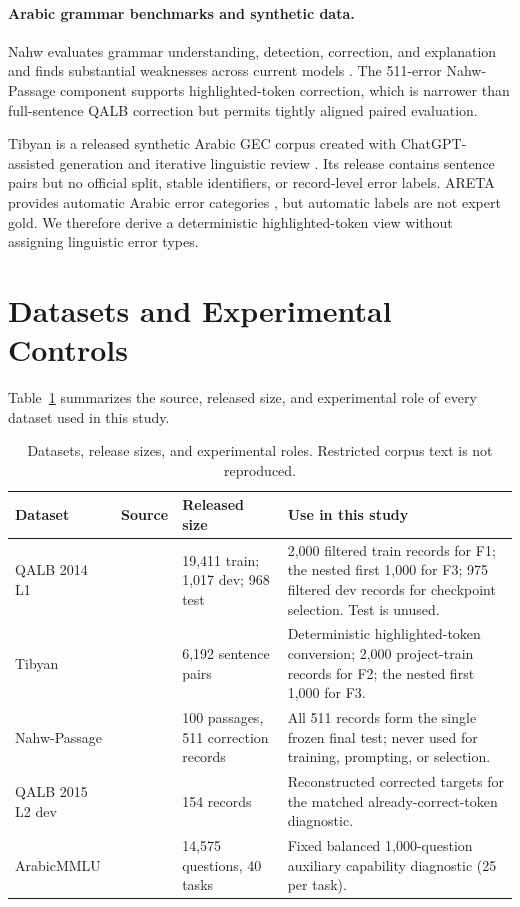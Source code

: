 \documentclass[11pt,a4paper]{article}
\begin{document}
\paragraph{Arabic grammar benchmarks and synthetic data.}
Nahw evaluates grammar understanding, detection, correction, and explanation
and finds substantial weaknesses across current models
\citep{mubarak-etal-2026-nahw}.  The 511-error Nahw-Passage component supports
highlighted-token correction, which is narrower than full-sentence QALB
correction but permits tightly aligned paired evaluation.

Tibyan is a released synthetic Arabic GEC corpus created with
ChatGPT-assisted generation and iterative linguistic review
\citep{alrehili-alhothali-2024-tibyan}.  Its release contains sentence pairs
but no official split, stable identifiers, or record-level error labels.
ARETA provides automatic Arabic error categories
\citep{belkebir-habash-2021-automatic}, but automatic labels are not expert
gold.  We therefore derive a deterministic highlighted-token view without
assigning linguistic error types.

\section{Datasets and Experimental Controls}

Table~\ref{tab:datasets} summarizes the source, released size, and experimental
role of every dataset used in this study.

\begin{table}[t]
\centering
\scriptsize
\setlength{\tabcolsep}{4pt}
\begin{tabular}{p{2.2cm}p{3.0cm}p{2.6cm}p{6.9cm}}
\toprule
Dataset & Source & Released size & Use in this study \\
\midrule
QALB 2014 L1 & \citet{mohit-etal-2014-first} & 19,411 train; 1,017 dev; 968 test & 2,000 filtered train records for F1; the nested first 1,000 for F3; 975 filtered dev records for checkpoint selection. Test is unused. \\
Tibyan & \citet{alrehili-alhothali-2024-tibyan} & 6,192 sentence pairs & Deterministic highlighted-token conversion; 2,000 project-train records for F2; the nested first 1,000 for F3. \\
Nahw-Passage & \citet{mubarak-etal-2026-nahw} & 100 passages, 511 correction records & All 511 records form the single frozen final test; never used for training, prompting, or selection. \\
QALB 2015 L2 dev & \citet{rozovskaya-etal-2015-second} & 154 records & Reconstructed corrected targets for the matched already-correct-token diagnostic. \\
ArabicMMLU & \citet{koto-etal-2024-arabicmmlu} & 14,575 questions, 40 tasks & Fixed balanced 1,000-question auxiliary capability diagnostic (25 per task). \\
\bottomrule
\end{tabular}
\caption{Datasets, release sizes, and experimental roles. Restricted corpus
text is not reproduced.}
\label{tab:datasets}
\end{table}
\end{document}
